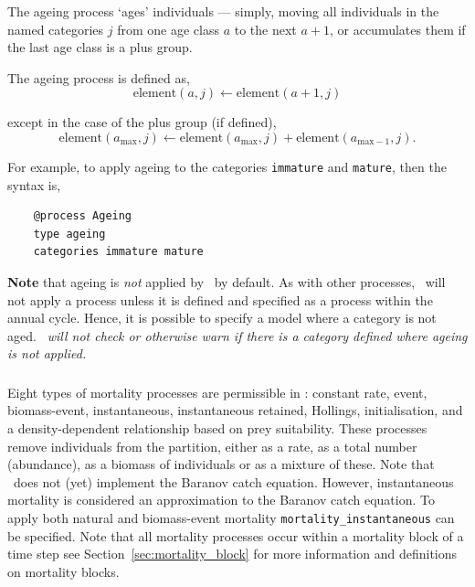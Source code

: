 \subsubsection{\label{sec:ageing}}

The ageing process `ages' individuals --- simply, moving all individuals in the named categories $j$ from one age class $a$ to the next $a + 1$, or accumulates them if the last age class is a plus group.

The ageing process is defined as,
\begin{equation}
  \text{element}(a,j) \leftarrow \text{element}(a + 1,j)
\end{equation}

except in the case of the plus group (if defined),
\begin{equation}
  \text{element}(a_{\text{max}}, j) \leftarrow \text{element}(a_{\text{max}}, j) + \text{element}(a_{\text{max}-1}, j).
\end{equation}

For example, to apply ageing to the categories \texttt{immature} and \texttt{mature}, then the syntax is,

{\small{\begin{verbatim}
	@process Ageing
	type ageing
	categories immature mature
	\end{verbatim}}}

\textbf{Note} that ageing is \emph{not} applied by \CNAME\ by default. As with other processes, \CNAME\ will not apply a process unless it is defined and specified as a process within the annual cycle. Hence, it is possible to specify a model where a category is not aged. \emph{\CNAME\ will not check or otherwise warn if there is a category defined where ageing is not applied.}

\subsubsection{\label{sec:mortality}}

Eight types of mortality processes are permissible in \CNAME: constant rate, event, biomass-event, instantaneous, instantaneous retained, Hollings, initialisation, and a density-dependent relationship based on prey suitability. These processes remove individuals from the partition, either as a rate, as a total number (abundance), as a biomass of individuals or as a mixture of these. Note that \CNAME\ does not (yet) implement the Baranov catch equation. However, instantaneous mortality is considered an approximation to the Baranov catch equation. To apply both natural and biomass-event mortality \texttt{mortality\_instantaneous} can be specified. Note that all mortality processes occur within a mortality block of a time step see Section~\ref{sec:mortality_block} for more information and definitions on mortality blocks.

